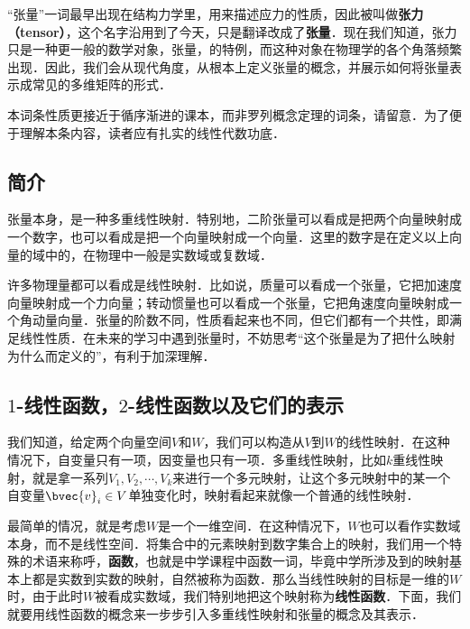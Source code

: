 


“张量”一词最早出现在结构力学里，用来描述应力的性质，因此被叫做\textbf{张力（tensor）}，这个名字沿用到了今天，只是翻译改成了\textbf{张量}．现在我们知道，张力只是一种更一般的数学对象，张量，的特例，而这种对象在物理学的各个角落频繁出现．因此，我们会从现代角度，从根本上定义张量的概念，并展示如何将张量表示成常见的多维矩阵的形式．

本词条性质更接近于循序渐进的课本，而非罗列概念定理的词条，请留意．为了便于理解本条内容，读者应有扎实的线性代数功底．

\subsection{简介}

张量本身，是一种多重线性映射．特别地，二阶张量可以看成是把两个向量映射成一个数字，也可以看成是把一个向量映射成一个向量．这里的数字是在定义以上向量的域中的，在物理中一般是实数域或复数域．

许多物理量都可以看成是线性映射．比如说，质量可以看成一个张量，它把加速度向量映射成一个力向量；转动惯量也可以看成一个张量，它把角速度向量映射成一个角动量向量．张量的阶数不同，性质看起来也不同，但它们都有一个共性，即满足线性性质．在未来的学习中遇到张量时，不妨思考“这个张量是为了把什么映射为什么而定义的”，有利于加深理解．

\subsection{$1$-线性函数，$2$-线性函数以及它们的表示}

我们知道，给定两个向量空间$V$和$W$，我们可以构造从$V$到$W$的线性映射．在这种情况下，自变量只有一项，因变量也只有一项．多重线性映射，比如$k$重线性映射，就是拿一系列$V_1, V_2, \cdots, V_k$来进行一个多元映射，让这个多元映射中的某一个自变量$\bvec{v}_i\in V$单独变化时，映射看起来就像一个普通的线性映射．

最简单的情况，就是考虑$W$是一个一维空间．在这种情况下，$W$也可以看作实数域本身，而不是线性空间．将集合中的元素映射到数字集合上的映射，我们用一个特殊的术语来称呼，\textbf{函数}，也就是中学课程中函数一词，毕竟中学所涉及到的映射基本上都是实数到实数的映射，自然被称为函数．那么当线性映射的目标是一维的$W$时，由于此时$W$被看成实数域，我们特别地把这个映射称为\textbf{线性函数}．下面，我们就要用线性函数的概念来一步步引入多重线性映射和张量的概念及其表示．

